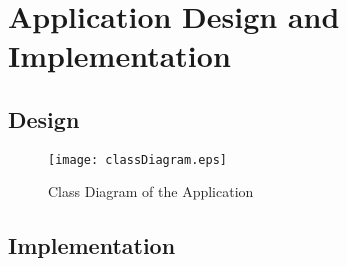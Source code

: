 \ifx\isEmbedded\undefined

\graphicspath{{../img/}}

\fi

\chapter{Application Design and Implementation}
\label{chap:application_design_implementation}

\section{Design}

\begin{landscape}

\begin{figure}[!htb]
  \centering
  \texttt{[image: classDiagram.eps]}
  \caption{Class Diagram of the Application}
  \label{fig:classDiag}
\end{figure}

\end{landscape}

\section{Implementation}


\ifx\isEmbedded\undefined


\pagebreak

\fi